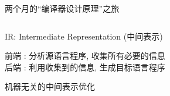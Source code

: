 \begin{frame}{}
  \begin{center}
    {\large 两个月的``编译器设计原理''之旅}

    \vspace{0.30cm}
    \begin{columns}
    \end{columns}
  \end{center}
\end{frame}


\begin{frame}{}
  \begin{center}
    IR: Intermediate Representation (中间表示)
    \vspace{0.50cm}


    \vspace{0.50cm}
    前端 : 分析源语言程序, 收集所有必要的信息 \\[8pt]
    后端 : 利用收集到的信息, 生成目标语言程序
  \end{center}
\end{frame}

\begin{frame}{}
  \begin{center}

    \vspace{0.50cm}
    机器无关的中间表示优化
  \end{center}
\end{frame}

